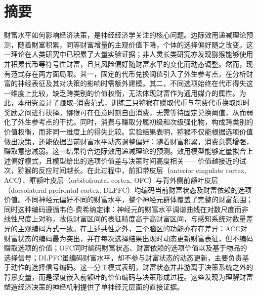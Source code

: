 
\maketitle%
\MAKETITLE%
\makedeclaration%
\intobmk\chapter*{摘\quad 要}%
\setcounter{page}{1}%

财富水平如何影响经济决策，是神经经济学关注的核心问题。边际效用递减理论预测，随着财富积累，同等财富增量的主观价值下降，个体的选择偏好随之改变。这一理论在人类研究中已积累了大量实验证据；非人灵长类研究亦发现猕猴能够使用并积累代币等符号性财富，且其风险偏好随财富水平的变化而动态调整。然而，现有范式存在两方面局限。其一，固定的代币兑换阈值引入了外生参考点，在分析财富的神经表征及其对决策的影响时需额外建模。其二，不同选项始终在代币得失这一维度上比较，缺乏跨类别的价值权衡，无法体现财富作为通用媒介的属性。为此，本研究设计了赚取--消费范式，训练三只猕猴在赚取代币与花费代币换取即时奖励之间进行抉择。猕猴可在任意时刻自由消费，无需等待固定兑换阈值，从而弱化了外生参考点的干扰。同时，消费与赚取分属初级和次级强化物，构成跨类别的价值权衡，而非同一维度上的得失比较。实验结果表明，猕猴不仅能根据选项价值做出决策，还能依据当前财富水平动态调整偏好：随着财富积累，消费意愿增强，赚取意愿减弱。这一结果符合边际效用递减理论的预测。效用模型能够定量拟合上述偏好模式，且模型给出的选项价值差与决策时间高度相关------价值越接近的试次，猕猴的反应时间越长。在此过程中，前扣带皮层（anterior cingulate cortex, ACC）、眶额叶皮层（orbitofrontal cortex, OFC）与背外侧前额叶皮层（dorsolateral prefrontal cortex, DLPFC）均编码当前财富状态及财富依赖的选项价值。不同神经元偏好不同的财富水平，整个神经元群体覆盖了完整的财富范围；同时这种编码遵循韦伯-费希纳定律：神经元的财富水平调谐曲线在对数尺度而非线性尺度上对称，故低财富区间的表征精度高于高财富区间，与感知系统对数量差异的主观编码方式一致。在上述共性之外，三个脑区的功能亦存在差异：ACC对财富状态的编码最为突出，并在每次选择结果出现时动态更新财富表征，但不编码赚取选项的价值；OFC同时编码财富状态、财富依赖的选项价值以及基于物品的选择信号；DLPFC虽编码财富水平，却不参与财富状态的动态更新，主要负责基于动作的选择信号编码。这一分工模式表明，财富状态并非游离于决策系统之外的背景变量，而是深度嵌入前额叶的价值编码与决策形成过程。这些发现为理解财富塑造经济决策的神经机制提供了单神经元层面的直接证据。

